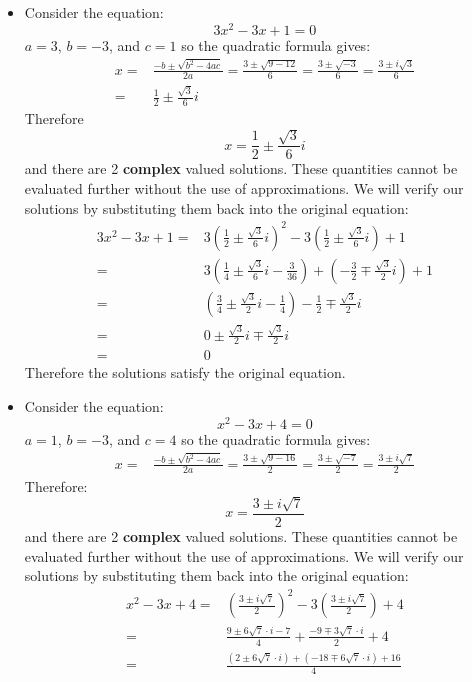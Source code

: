 \documentclass{article}
\begin{document}
\begin{itemize}
\item Consider the equation: 
\[3x^2 - 3x + 1 = 0\]
\(a = 3\), \(b = -3\), and \(c = 1\) so the quadratic formula gives:
\begin{align*}
x = & \frac{-b \pm \sqrt{b^2 - 4ac}}{2a} 
= \frac{3 \pm \sqrt{9 - 12}}{6} 
= \frac{3 \pm \sqrt{-3}}{6} 
= \frac{3 \pm i\sqrt{3}}{6} \\
= & \frac{1}{2} \pm \frac{\sqrt{3}}{6} i
\end{align*}
Therefore
\[x = \frac{1}{2} \pm \frac{\sqrt{3}}{6} i\]
and there are 2 {\bf complex} valued solutions. These quantities cannot be evaluated further without the use of approximations. We will verify our solutions by substituting them back into the original equation:
\begin{align*}
3x^2 - 3x + 1 
= & 3\left(\frac{1}{2} \pm \frac{\sqrt{3}}{6} i\right)^2 - 3\left(\frac{1}{2} \pm \frac{\sqrt{3}}{6} i\right) + 1 \\
= & 3\left(\frac{1}{4} \pm \frac{\sqrt{3}}{6}i - \frac{3}{36}\right) + \left(-\frac{3}{2} \mp \frac{\sqrt{3}}{2} i\right) + 1 \\
= & \left(\frac{3}{4} \pm \frac{\sqrt{3}}{2}i - \frac{1}{4}\right) - \frac{1}{2} \mp \frac{\sqrt{3}}{2} i \\
= & 0 \pm \frac{\sqrt{3}}{2}i \mp \frac{\sqrt{3}}{2} i \\
= & 0
\end{align*}
Therefore the solutions satisfy the original equation.
\item Consider the equation: 
\[x^2 - 3x + 4 = 0\]
\(a = 1\), \(b = -3\), and \(c = 4\) so the quadratic formula gives:
\begin{align*}
x = & \frac{-b \pm \sqrt{b^2 - 4ac}}{2a} 
= \frac{3 \pm \sqrt{9 - 16}}{2} 
= \frac{3 \pm \sqrt{-7}}{2} 
= \frac{3 \pm i\sqrt{7}}{2} 
\end{align*}
Therefore:
\[x = \frac{3 \pm i\sqrt{7}}{2}\]
and there are 2 {\bf complex} valued solutions. These quantities cannot be evaluated further without the use of approximations. We will verify our solutions by substituting them back into the original equation:
\begin{align*}
x^2 - 3x + 4
= & \left(\frac{3 \pm i\sqrt{7}}{2}\right)^2 - 3\left(\frac{3 \pm i\sqrt{7}}{2}\right) + 4 \\
= & \frac{9 \pm 6\sqrt{7} \cdot i - 7}{4} + \frac{-9 \mp 3\sqrt{7} \cdot i}{2} + 4 \\
= & \frac{(2 \pm 6\sqrt{7} \cdot i) + (-18 \mp 6\sqrt{7} \cdot i) + 16}{4} \\

\end{align*}
\end{itemize}
\end{document}
